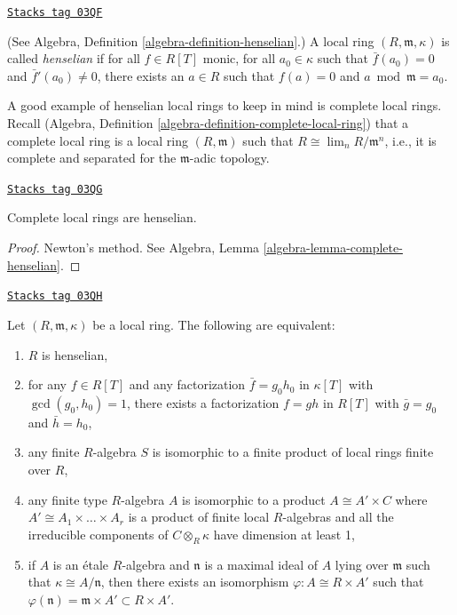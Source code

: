 \begin{definition}[Henselian]
\label{etale-cohomology-definition-henselian}
\href{https://stacks.math.columbia.edu/tag/03QF}{\texttt{Stacks tag 03QF}}

(See Algebra, Definition \ref{algebra-definition-henselian}.)
A local ring $(R, \mathfrak m, \kappa)$ is called
{\it henselian} if for all
$f \in R[T]$ monic, for all $a_0 \in \kappa$ such that
$\bar f(a_0) = 0$ and $\bar f'(a_0) \neq 0$, there exists
an $a \in R$ such that $f(a) = 0$ and $a \bmod \mathfrak m = a_0$.
\end{definition}

A good example of henselian local rings
to keep in mind is complete local rings.
Recall
(Algebra, Definition \ref{algebra-definition-complete-local-ring})
that a complete local ring is a local ring $(R, \mathfrak m)$ such that
$R \cong \lim_n R/\mathfrak m^n$, i.e., it is complete and separated
for the $\mathfrak m$-adic topology.

\begin{theorem}[Hensel]
\label{etale-cohomology-theorem-hensel}
\href{https://stacks.math.columbia.edu/tag/03QG}{\texttt{Stacks tag 03QG}}

Complete local rings are henselian.
\end{theorem}

\begin{proof}
Newton's method. See
Algebra, Lemma \ref{algebra-lemma-complete-henselian}.
\end{proof}

\begin{theorem}[Henselian]
\label{etale-cohomology-theorem-henselian}
\href{https://stacks.math.columbia.edu/tag/03QH}{\texttt{Stacks tag 03QH}}

Let $(R, \mathfrak m, \kappa)$ be a local ring. The following are equivalent:
\begin{enumerate}
\item $R$ is henselian,
\item for any $f\in R[T]$ and any factorization $\bar f = g_0 h_0$ in
$\kappa[T]$ with $\gcd(g_0, h_0)=1$, there exists a factorization $f = gh$ in
$R[T]$ with $\bar g = g_0$ and $\bar h = h_0$,
\item any finite $R$-algebra $S$ is isomorphic to a finite product of
local rings finite over $R$,
\item any finite type $R$-algebra $A$ is isomorphic to a product
$A \cong A' \times C$ where $A' \cong A_1 \times \ldots \times A_r$
is a product of finite local $R$-algebras and all the irreducible
components of $C \otimes_R \kappa$ have dimension at least 1,
\item if $A$ is an \'etale $R$-algebra and $\mathfrak n$ is a maximal ideal of
$A$ lying over $\mathfrak m$ such that $\kappa \cong A/\mathfrak n$, then there
exists an isomorphism $\varphi : A \cong R \times A'$ such that
$\varphi(\mathfrak n) = \mathfrak m \times A' \subset R \times A'$.
\end{enumerate}
\end{theorem}

